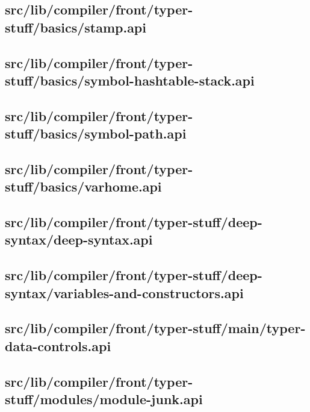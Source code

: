 \subsection{src/lib/compiler/front/typer-stuff/basics/stamp.api}


\subsection{src/lib/compiler/front/typer-stuff/basics/symbol-hashtable-stack.api}


\subsection{src/lib/compiler/front/typer-stuff/basics/symbol-path.api}


\subsection{src/lib/compiler/front/typer-stuff/basics/varhome.api}


\subsection{src/lib/compiler/front/typer-stuff/deep-syntax/deep-syntax.api}


\subsection{src/lib/compiler/front/typer-stuff/deep-syntax/variables-and-constructors.api}


\subsection{src/lib/compiler/front/typer-stuff/main/typer-data-controls.api}


\subsection{src/lib/compiler/front/typer-stuff/modules/module-junk.api}


